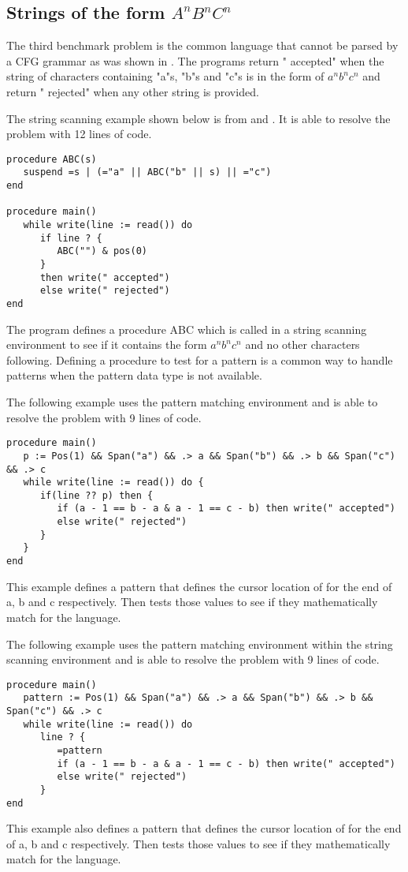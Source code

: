 \documentclass{article}
\begin{document}
\subsection{Strings of the form \emph{$A^nB^nC^n$}}
The third benchmark problem is the common language that cannot be parsed by a CFG grammar as was shown in \cite{Gaikaiwari2005}.  The programs return " accepted" when the string of characters containing "a"s, "b"s and "c"s is in the form of $a^nb^nc^n$ and return " rejected" when any other string is provided.

The string scanning example shown below is from \cite{Gaikaiwari2005} and \cite{Griswold1975}.  It is able to resolve the problem with 12 lines of code.
\begin{verbatim}
procedure ABC(s)
   suspend =s | (="a" || ABC("b" || s) || ="c")
end

procedure main()
   while write(line := read()) do
      if line ? {
         ABC("") & pos(0)
      } 
      then write(" accepted")
      else write(" rejected")
end
\end{verbatim}
The program defines a procedure ABC which is called in a string scanning environment to see if it contains the form $a^nb^nc^n$ and no other characters following.  Defining a procedure to test for a pattern is a common way to handle patterns when the pattern data type is not available.

The following example uses the pattern matching environment and is able to resolve the problem with 9 lines of code.
\begin{verbatim}
procedure main()
   p := Pos(1) && Span("a") && .> a && Span("b") && .> b && Span("c") && .> c
   while write(line := read()) do {
      if(line ?? p) then {
         if (a - 1 == b - a & a - 1 == c - b) then write(" accepted")
         else write(" rejected")
      }
   }
end
\end{verbatim}
This example defines a pattern that defines the cursor location of for the end of a, b and c respectively.  Then tests those values to see if they mathematically match for the language. 

The following example uses the pattern matching environment within the string scanning environment and is able to resolve the problem with 9 lines of code.
\begin{verbatim}
procedure main()
   pattern := Pos(1) && Span("a") && .> a && Span("b") && .> b && Span("c") && .> c 
   while write(line := read()) do
      line ? {
         =pattern
         if (a - 1 == b - a & a - 1 == c - b) then write(" accepted")
         else write(" rejected")
      }
end
\end{verbatim}
This example also defines a pattern that defines the cursor location of for the end of a, b and c respectively.  Then tests those values to see if they mathematically match for the language.
\end{document}
